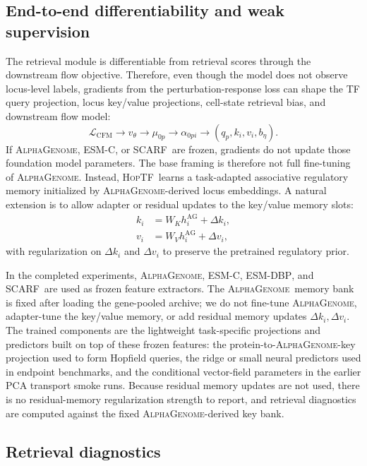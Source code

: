 \documentclass[11pt]{article}
\newcommand{\hoptf}{\textsc{HopTF}}
\newcommand{\ag}{\textsc{AlphaGenome}}
\newcommand{\scarf}{\textsc{SCARF}}
\newcommand{\esm}{\textsc{ESM-C}}
\newcommand{\esmdbp}{\textsc{ESM-DBP}}
\begin{document}
\subsection{End-to-end differentiability and weak supervision}

The retrieval module is differentiable from retrieval scores through the downstream flow objective. Therefore, even though the model does not observe locus-level labels, gradients from the perturbation-response loss can shape the TF query projection, locus key/value projections, cell-state retrieval bias, and downstream flow model:
\begin{equation}
    \mathcal{L}_{\mathrm{CFM}} \rightarrow v_\theta \rightarrow \mu_{0p} \rightarrow \alpha_{0pi} \rightarrow (q_p,k_i,v_i,b_\eta).
\end{equation}
If \ag, \esm, or \scarf\ are frozen, gradients do not update those foundation model parameters. The base framing is therefore not full fine-tuning of \ag. Instead, \hoptf\ learns a task-adapted associative regulatory memory initialized by \ag-derived locus embeddings. A natural extension is to allow adapter or residual updates to the key/value memory slots:
\begin{align}
    k_i &= W_K h_i^{\mathrm{AG}} + \Delta k_i,\\
    v_i &= W_V h_i^{\mathrm{AG}} + \Delta v_i,
\end{align}
with regularization on \(\Delta k_i\) and \(\Delta v_i\) to preserve the pretrained regulatory prior.

In the completed experiments, \ag, \esm, \esmdbp, and \scarf\ are used as frozen feature extractors. The \ag\ memory bank is fixed after loading the gene-pooled archive; we do not fine-tune \ag, adapter-tune the key/value memory, or add residual memory updates \(\Delta k_i,\Delta v_i\). The trained components are the lightweight task-specific projections and predictors built on top of these frozen features: the protein-to-\ag-key projection used to form Hopfield queries, the ridge or small neural predictors used in endpoint benchmarks, and the conditional vector-field parameters in the earlier PCA transport smoke runs. Because residual memory updates are not used, there is no residual-memory regularization strength to report, and retrieval diagnostics are computed against the fixed \ag-derived key bank.

\subsection{Retrieval diagnostics}
\end{document}
